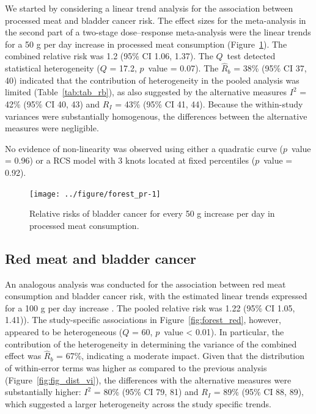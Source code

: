 \documentclass[11pt,a4paper,twoside,openany]{book}\usepackage{knitr}
\begin{document}
{{\noindent We started by considering a linear trend analysis for the association between processed meat and bladder cancer risk. The effect sizes for the meta-analysis in the second part of a two-stage dose--response meta-analysis were the linear trends for a 50 g per day increase in processed meat consumption (Figure~\ref{fig:forest_pr}). The combined relative risk was 1.2 (95\% CI 1.06, 1.37). The $Q$~test detected statistical heterogeneity ($Q $ = 17.2, $p$~value = 0.07). The $\hat R_b$ = 38\% (95\% CI 37, 40) indicated that the contribution of heterogeneity in the pooled analysis was limited (Table~\ref{tab:tab_rb}), as also suggested by the alternative measures $I^2$ = 42\% (95\% CI 40, 43) and $R_I$ = 43\% (95\% CI 41, 44). Because the within-study variances were substantially homogenous, the differences between the alternative measures were negligible. 

\noindent No evidence of non-linearity was observed using either a quadratic curve ($p$~value = 0.96) or a RCS model with 3 knots located at fixed percentiles ($p$~value = 0.92).

\begin{knitrout}\footnotesize
{}\color{fgcolor}\begin{figure}[ht!]

{\centering \texttt{[image: ../figure/forest\_pr-1]} 

}

\caption[Relative risks of bladder cancer for every 50 g increase per day in processed meat consumption]{Relative risks of bladder cancer for every 50 g increase per day in processed meat consumption.}\label{fig:forest_pr}
\end{figure}


\end{knitrout}

\subsection{Red meat and bladder cancer}



An analogous analysis was conducted for the association between red meat consumption and bladder cancer risk, with the estimated linear trends expressed for a 100 g per day increase \citep{crippa2016red}. The pooled relative risk was 1.22 (95\% CI 1.05, 1.41)). The study-specific associations in Figure~\ref{fig:forest_red}, however, appeared to be heterogeneous ($Q $ = 60, $p$~value < 0.01). In particular, the contribution of the heterogeneity in determining the variance of the combined effect was $\hat R_b$ = 67\%, indicating a moderate impact. Given that the distribution of within-error terms was higher as compared to the previous analysis (Figure~\ref{fig:fig_dist_vi}), the differences with the alternative measures were substantially higher: $I^2$ = 80\% (95\% CI 79, 81) and $R_I$ = 89\% (95\% CI 88, 89), which suggested a larger heterogeneity across the study specific trends. 

}}
\end{document}
